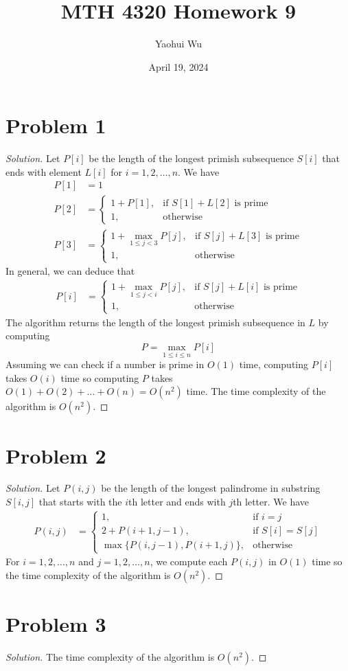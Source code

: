 \documentclass[12pt]{article}
\title{MTH 4320 Homework 9}
\author{Yaohui Wu}
\date{April 19, 2024}
\newenvironment*{solution}{\begin{proof}[Solution]}{\end{proof}}
\begin{document}
\maketitle
\section*{Problem 1}
\begin{solution}
    Let \(P[i]\) be the length of the longest primish subsequence \(S[i]\)
    that ends with element \(L[i]\) for \(i=1,2,\dots,n\). We have
    \begin{align*}
        P[1] &= 1 \\
        P[2] &= \begin{cases}
            1+P[1], &\text{if \(S[1]+L[2]\) is prime} \\
            1, &\text{otherwise}
        \end{cases} \\
        P[3] &= \begin{cases}
            1+\max_{1\leq j<3}P[j], &\text{if \(S[j]+L[3]\) is prime} \\
            1, &\text{otherwise}
        \end{cases}
    \end{align*}
    In general, we can deduce that
    \begin{align*}
        P[i] &= \begin{cases}
            1+\max_{1\leq j<i}P[j], &\text{if \(S[j]+L[i]\) is prime} \\
            1, &\text{otherwise}
        \end{cases}
    \end{align*}
    The algorithm returns the length of the longest primish subsequence in
    \(L\) by computing \[P=\max_{1\leq i\leq n}P[i]\] Assuming we can check if
    a number is prime in \(O(1)\) time, computing \(P[i]\) takes \(O(i)\) time
    so computing \(P\) takes \(O(1)+O(2)+\dots+O(n)=O(n^2)\) time. The time
    complexity of the algorithm is \(O(n^2)\).
\end{solution}
\section*{Problem 2}
\begin{solution}
    Let \(P(i,j)\) be the length of the longest palindrome in substring
    \(S[i,j]\) that starts with the \(i\)th letter and ends with \(j\)th
    letter. We have
    \begin{align*}
        P(i,j) &= \begin{cases}
            1, &\text{if \(i=j\)} \\
            2+P(i+1,j-1), &\text{if \(S[i]=S[j]\)} \\
            \max\{P(i,j-1),P(i+1,j)\}, &\text{otherwise}
        \end{cases}
    \end{align*}
    For \(i=1,2,\dots,n\) and \(j=1,2,\dots,n\), we compute each \(P(i,j)\) in
    \(O(1)\) time so the time complexity of the algorithm is \(O(n^2)\).
\end{solution}
\section*{Problem 3}
\begin{solution}
    The time complexity of the algorithm is \(O(n^2)\).
\end{solution}
\end{document}
